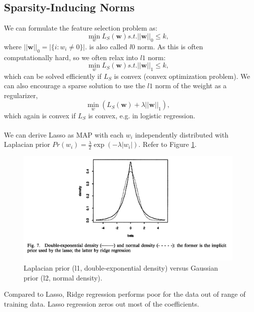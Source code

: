 \documentclass{article}
\begin{document}
   \subsection{Sparsity-Inducing Norms}
   We can formulate the feature selection problem as:
   \begin{equation}
   \min_{w} L_S(\textbf{w}) s.t. ||\textbf{w}||_0 \leq k,
   \end{equation}
   where $||\textbf{w}||_0 = |\{ i:w_i \neq 0 \}|.$ is also called $l0$ norm. As this is often computationally hard, so we often relax into $l1$ norm:
   \begin{equation}
   \min_{w} L_S(\textbf{w}) s.t. ||\textbf{w}||_1 \leq k,
   \end{equation}
   which can be solved efficiently if $L_S$ is convex (convex optimization problem). We can also encourage a sparse solution to use the $l1$ norm of the weight as a regularizer,
   \begin{equation}
   \min_{w} (L_S(\textbf{w}) + \lambda ||\textbf{w}||_1),
   \end{equation}
   which again is convex if $L_S$ is convex, e.g. in logistic regression. 
   \\\\
   We can derive Lasso as MAP with each $w_i$ independently distributed with Laplacian prior $Pr(w_i) = \frac{\lambda}{2}\exp(-\lambda |w_i|)$. Refer to Figure \ref{fig:lasso_ridge}.
   \begin{figure}[h!]
   \centering
   \includegraphics[width=.8\columnwidth]{lasso_ridge}
   \caption{Laplacian prior (l1, double-exponential density) versus Gaussian prior (l2, normal density).}
   \label{fig:lasso_ridge}
   \end{figure}
   Compared to Lasso, Ridge regression performs poor for the data out of range of training data. Lasso regression zeros out most of the coefficients.
   
\end{document}
